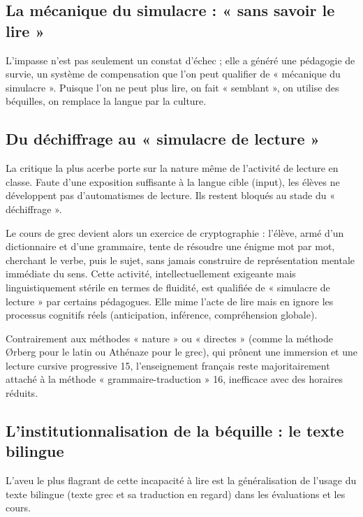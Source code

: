 \subsection{La mécanique du simulacre : « sans savoir le lire »}

L'impasse n'est pas seulement un constat d'échec ; elle a généré une pédagogie de survie, un système
de compensation que l'on peut qualifier de « mécanique du simulacre ». Puisque l'on ne peut plus
lire, on fait « semblant », on utilise des béquilles, on remplace la langue par la culture.



\subsection{Du déchiffrage au « simulacre de lecture »}

La critique la plus acerbe porte sur la nature même de l'activité de lecture en classe. Faute d'une
exposition suffisante à la langue cible (input), les élèves ne développent pas d'automatismes de
lecture. Ils restent bloqués au stade du « déchiffrage ».\cite{I-3-3-ref13}

Le cours de grec devient alors un exercice de cryptographie : l'élève, armé d'un dictionnaire et
d'une grammaire, tente de résoudre une énigme mot par mot, cherchant le verbe, puis le sujet, sans
jamais construire de représentation mentale immédiate du sens. Cette activité, intellectuellement
exigeante mais linguistiquement stérile en termes de fluidité, est qualifiée de « simulacre de
lecture » par certains pédagogues.\cite{I-3-3-ref14} Elle mime l'acte de lire mais en ignore les
processus cognitifs réels (anticipation, inférence, compréhension globale).

Contrairement aux méthodes « nature » ou « directes » (comme la méthode Ørberg pour le latin ou
Athénaze pour le grec), qui prônent une immersion et une lecture cursive progressive 15,
l'enseignement français reste majoritairement attaché à la méthode « grammaire-traduction » 16,
inefficace avec des horaires réduits.



\subsection{L'institutionnalisation de la béquille : le texte bilingue}

L'aveu le plus flagrant de cette incapacité à lire est la généralisation de l'usage du texte
bilingue (texte grec et sa traduction en regard) dans les évaluations et les cours.

